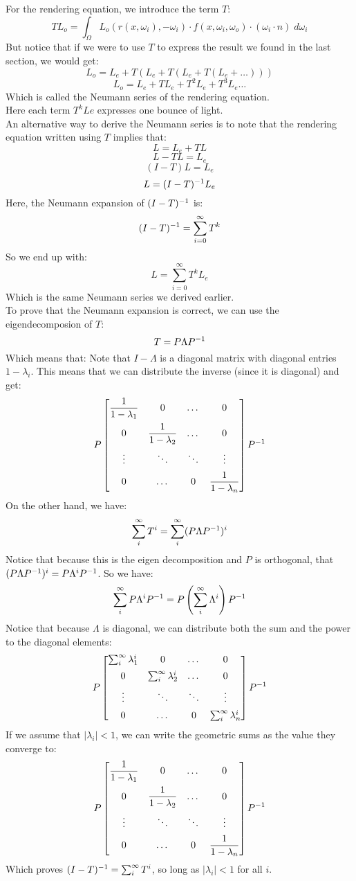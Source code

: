 \documentclass[12pt]{article}
\begin{document}
For the rendering equation, we introduce the term $T$:
\[ TL_o =  \int_\Omega L_o(r(x, \omega_i), -\omega_i)  \cdot
f(x, \omega_i, \omega_o) \cdot
(\omega_i \cdot n) \; d\omega_i \]
But notice that if we were to use $T$
to express the result we found in the last section, we
would get:
\[ L_o = L_e + T( L_e + T( L_e + T (L_e + \dots))) \]
\[ L_o = L_e + TL_e + T^2L_e + T^3L_e \dots \]
Which is called the Neumann series of the rendering equation. \\

Here each term $T^kLe$ expresses one bounce of light. \\

An alternative way to derive the Neumann series
is to note that the rendering equation written using $T$
implies that:
\[ L = L_e + TL \]
\[ L - TL = L_e \]
\[ (I - T)L = L_e \]
\[ L = (I-T)^{-1} L_e \]
Here, the Neumann expansion of $(I-T)^{-1}$ is:
\[ (I-T)^{-1} = \sum_{i=0}^\infty T^k \]
So we end up with:
\[ L = \sum_{i=0}^\infty T^kL_e \]
Which is the same Neumann series we derived earlier. \\

To prove that the Neumann expansion is correct,
we can use the eigendecomposion of $T$:
\[ T = P\Lambda P^{-1} \]
Which means that:
Note that $I - \Lambda$
is a diagonal matrix with diagonal entries
$1 - \lambda_i$. This means that
we can distribute the inverse (since it is
diagonal) and get:
\[ P \bmat{ 
\dfrac{1}{1-\lambda_1} & 0 & \dots & 0 \vs{5} \\
0 & \dfrac{1}{1-\lambda_2} & \dots & 0 \vs{5} \\
\vdots & \ddots & \ddots & \vdots \vs{5} \\
0 & \dots & 0 & \dfrac{1}{1-\lambda_n} } P\inv \]
On the other hand, we have:
 \[ \sum_i^{\infty} T^i
= \sum_i^{\infty} (P\Lambda P^{-1})^i \]
Notice that because this is the eigen decomposition
and $P$ is orthogonal,
that $(P\Lambda P^{-1})^i = P\Lambda^i P^{-1}$.
So we have:
\[ \sum_i^{\infty} P\Lambda^i P^{-1}
= P \left( \sum_i^{\infty}\Lambda^i \right) P^{-1} \]
Notice that because $\Lambda$ 
is diagonal, we can distribute both the 
sum and the power to the diagonal elements:
\[ P \bmat{ 
\sum_i^{\infty} \lambda_1^i & 0 & \dots & 0 \vs{5} \\
0 & \sum_i^{\infty} \lambda_2^i & \dots & 0 \vs{5} \\
\vdots & \ddots & \ddots & \vdots \vs{5} \\
0 & \dots & 0 & \sum_i^{\infty} \lambda_n^i } P\inv \]
If we assume that $|\lambda_i| < 1$,
we can write the geometric sums
as the value they converge to:
\[ P \bmat{ 
\dfrac{1}{1-\lambda_1} & 0 & \dots & 0 \vs{5} \\
0 & \dfrac{1}{1-\lambda_2} & \dots & 0 \vs{5} \\
\vdots & \ddots & \ddots & \vdots \vs{5} \\
0 & \dots & 0 & \dfrac{1}{1-\lambda_n} } P\inv \]
Which proves  $(I-T)^{-1} =  \sum_i^{\infty} T^i$,
so long as $|\lambda_i| < 1$ for all $i$. \\
\end{document}
